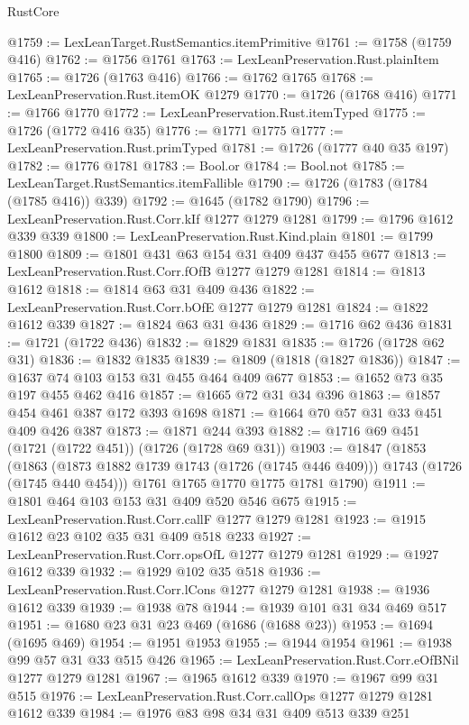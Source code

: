\begin{lexlean}{RustCore}
\begin{coremodule}
@1759 := LexLeanTarget.RustSemantics.itemPrimitive
@1761 := @1758 (@1759 @416)
@1762 := @1756 @1761
@1763 := LexLeanPreservation.Rust.plainItem
@1765 := @1726 (@1763 @416)
@1766 := @1762 @1765
@1768 := LexLeanPreservation.Rust.itemOK @1279
@1770 := @1726 (@1768 @416)
@1771 := @1766 @1770
@1772 := LexLeanPreservation.Rust.itemTyped
@1775 := @1726 (@1772 @416 @35)
@1776 := @1771 @1775
@1777 := LexLeanPreservation.Rust.primTyped
@1781 := @1726 (@1777 @40 @35 @197)
@1782 := @1776 @1781
@1783 := Bool.or
@1784 := Bool.not
@1785 := LexLeanTarget.RustSemantics.itemFallible
@1790 := @1726 (@1783 (@1784 (@1785 @416)) @339)
@1792 := @1645 (@1782 @1790)
@1796 := LexLeanPreservation.Rust.Corr.kIf @1277 @1279 @1281
@1799 := @1796 @1612 @339 @339
@1800 := LexLeanPreservation.Rust.Kind.plain
@1801 := @1799 @1800
@1809 := @1801 @431 @63 @154 @31 @409 @437 @455 @677
@1813 := LexLeanPreservation.Rust.Corr.fOfB @1277 @1279 @1281
@1814 := @1813 @1612
@1818 := @1814 @63 @31 @409 @436
@1822 := LexLeanPreservation.Rust.Corr.bOfE @1277 @1279 @1281
@1824 := @1822 @1612 @339
@1827 := @1824 @63 @31 @436
@1829 := @1716 @62 @436
@1831 := @1721 (@1722 @436)
@1832 := @1829 @1831
@1835 := @1726 (@1728 @62 @31)
@1836 := @1832 @1835
@1839 := @1809 (@1818 (@1827 @1836))
@1847 := @1637 @74 @103 @153 @31 @455 @464 @409 @677
@1853 := @1652 @73 @35 @197 @455 @462 @416
@1857 := @1665 @72 @31 @34 @396
@1863 := @1857 @454 @461 @387 @172 @393 @1698
@1871 := @1664 @70 @57 @31 @33 @451 @409 @426 @387
@1873 := @1871 @244 @393
@1882 := @1716 @69 @451 (@1721 (@1722 @451)) (@1726 (@1728 @69 @31))
@1903 := @1847
    (@1853
      (@1863 (@1873 @1882 @1739 @1743 (@1726 (@1745 @446 @409))) @1743 (@1726 (@1745 @440 @454)))
      @1761
      @1765
      @1770
      @1775
      @1781
      @1790)
@1911 := @1801 @464 @103 @153 @31 @409 @520 @546 @675
@1915 := LexLeanPreservation.Rust.Corr.callF @1277 @1279 @1281
@1923 := @1915 @1612 @23 @102 @35 @31 @409 @518 @233
@1927 := LexLeanPreservation.Rust.Corr.opsOfL @1277 @1279 @1281
@1929 := @1927 @1612 @339
@1932 := @1929 @102 @35 @518
@1936 := LexLeanPreservation.Rust.Corr.lCons @1277 @1279 @1281
@1938 := @1936 @1612 @339
@1939 := @1938 @78
@1944 := @1939 @101 @31 @34 @469 @517
@1951 := @1680 @23 @31 @23 @469 (@1686 (@1688 @23))
@1953 := @1694 (@1695 @469)
@1954 := @1951 @1953
@1955 := @1944 @1954
@1961 := @1938 @99 @57 @31 @33 @515 @426
@1965 := LexLeanPreservation.Rust.Corr.eOfBNil @1277 @1279 @1281
@1967 := @1965 @1612 @339
@1970 := @1967 @99 @31 @515
@1976 := LexLeanPreservation.Rust.Corr.callOps @1277 @1279 @1281 @1612 @339
@1984 := @1976 @83 @98 @34 @31 @409 @513 @339 @251

\end{coremodule}
\end{lexlean}
